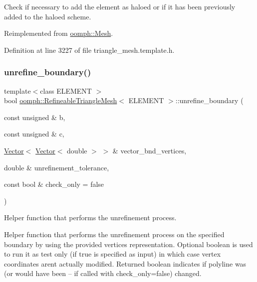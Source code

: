 Check if necessary to add the element as haloed or if it has been previously added to the haloed scheme. 



Reimplemented from \hyperlink{classoomph_1_1Mesh_aafe4f0a71859972be0c7c0957c69d5de}{oomph\+::\+Mesh}.



Definition at line 3227 of file triangle\+\_\+mesh.\+template.\+h.

\mbox{\label{classoomph_1_1RefineableTriangleMesh_a504b89cdb0149dc7cbbf50bc270829fe}} 
\subsubsection{\texorpdfstring{unrefine\+\_\+boundary()}{unrefine\_boundary()}}
{\footnotesize\ttfamily template$<$class E\+L\+E\+M\+E\+NT $>$ \\
bool \hyperlink{classoomph_1_1RefineableTriangleMesh}{oomph\+::\+Refineable\+Triangle\+Mesh}$<$ E\+L\+E\+M\+E\+NT $>$\+::unrefine\+\_\+boundary (\begin{DoxyParamCaption}\item[{const unsigned \&}]{b,  }\item[{const unsigned \&}]{c,  }\item[{\hyperlink{classoomph_1_1Vector}{Vector}$<$ \hyperlink{classoomph_1_1Vector}{Vector}$<$ double $>$ $>$ \&}]{vector\+\_\+bnd\+\_\+vertices,  }\item[{double \&}]{unrefinement\+\_\+tolerance,  }\item[{const bool \&}]{check\+\_\+only = {\ttfamily false} }\end{DoxyParamCaption})\hspace{0.3cm}{\ttfamily [protected]}}



Helper function that performs the unrefinement process. 

Helper function that performs the unrefinement process on the specified boundary by using the provided vertices representation. Optional boolean is used to run it as test only (if true is specified as input) in which case vertex coordinates aren\textquotesingle{}t actually modified. Returned boolean indicates if polyline was (or would have been -- if called with check\+\_\+only=false) changed.

